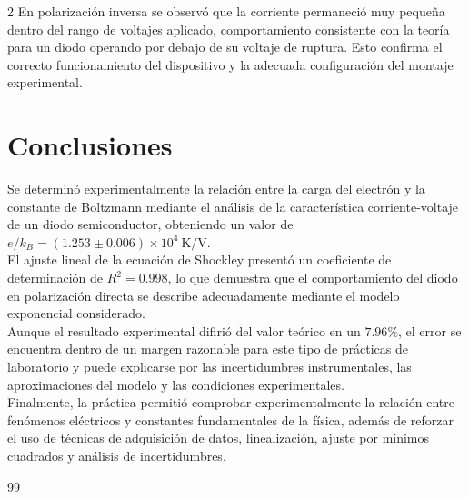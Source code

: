 \documentclass[letterpaper, onecolumn, 12pt]{article} %
\begin{document}
\begin{multicols}{2}
\noindent En polarización inversa se observó que la corriente permaneció muy pequeña dentro del rango de voltajes aplicado, comportamiento consistente con la teoría para un diodo operando por debajo de su voltaje de ruptura. Esto confirma el correcto funcionamiento del dispositivo y la adecuada configuración del montaje experimental.\\

\section{Conclusiones}
\noindent Se determinó experimentalmente la relación entre la carga del electrón y la constante de Boltzmann mediante el análisis de la característica corriente-voltaje de un diodo semiconductor, obteniendo un valor de $e/k_B=(1.253\pm0.006)\times10^4\ \mathrm{K/V}$.\\

\noindent El ajuste lineal de la ecuación de Shockley presentó un coeficiente de determinación de $R^2=0.998$, lo que demuestra que el comportamiento del diodo en polarización directa se describe adecuadamente mediante el modelo exponencial considerado.\\

\noindent Aunque el resultado experimental difirió del valor teórico en un $7.96 \%$, el error se encuentra dentro de un margen razonable para este tipo de prácticas de laboratorio y puede explicarse por las incertidumbres instrumentales, las aproximaciones del modelo y las condiciones experimentales.\\

\noindent Finalmente, la práctica permitió comprobar experimentalmente la relación entre fenómenos eléctricos y constantes fundamentales de la física, además de reforzar el uso de técnicas de adquisición de datos, linealización, ajuste por mínimos cuadrados y análisis de incertidumbres.\\
\begin{thebibliography}{99}

\end{thebibliography}	
\end{multicols} %
\pagebreak
\end{document}
